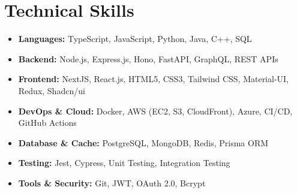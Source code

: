 \documentclass[letterpaper,11pt]{article}
\begin{document}
\section{Technical Skills}
\begin{itemize}[leftmargin=*,itemsep=2pt,parsep=0pt,topsep=0pt,partopsep=0pt]
    \item \textbf{Languages:} TypeScript, JavaScript, Python, Java, C++, SQL
    \item \textbf{Backend:} Node.js, Express.js, Hono, FastAPI, GraphQL, REST APIs
    \item \textbf{Frontend:} NextJS, React.js, HTML5, CSS3, Tailwind CSS, Material-UI, Redux, Shadcn/ui
    \item \textbf{DevOps \& Cloud:} Docker, AWS (EC2, S3, CloudFront), Azure, CI/CD, GitHub Actions
    \item \textbf{Database \& Cache:} PostgreSQL, MongoDB, Redis, Prisma ORM
    \item \textbf{Testing:} Jest, Cypress, Unit Testing, Integration Testing
    \item \textbf{Tools \& Security:} Git, JWT, OAuth 2.0, Bcrypt
\end{itemize}
\vspace{-7pt}

\end{document}
